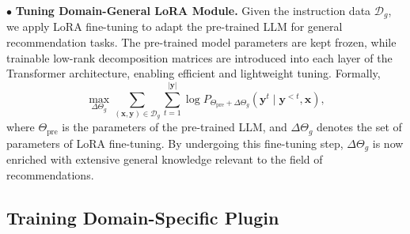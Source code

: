 \iffalse
We denote the mixed user, item, and the interaction set as $\mathcal{U}$, $\mathcal{I}$, $\mathcal{S}$, respectively.
For each user interaction sequence $\mathcal{S}_u=\left[i_u^1, i_u^2, \ldots, i_u^L\right]$ 

For the instruction template, 

 
To provide general user modeling and recommendation knowledge, we mix user behaviors $\mathcal{S}_u=\left[i_u^1, i_u^2, \ldots, i_u^L\right]$ from multiple domains and reconstruct a recommendation instruction dataset $\mathcal{D}_{g}=\{(\textbf{x},\textbf{y})\}$, where $\textbf{x}$ and $\textbf{y}$ denote the instruction input and output, respectively. The choice of the instruction format and the original user behaviors data can be arbitrary. In this work, we collect 8 domains' user recommendation data from Amazon Review dataset\footnote{\url{https://cseweb.ucsd.edu/~jmcauley/datasets.html}}, including Clothing, Cell, Grocery, Health, Home, Pet, Tools, and Videos. Specifically, as shown in the left part of Figure \ref{fig:phase1}, the instruction input starts from a system prompt that defines the LLM's role-"\textit{You are a helpful recommendation assistant}"
\fi

\noindent$\bullet$ \quad\textbf{Tuning Domain-General LoRA Module.}
Given the instruction data $\mathcal{D}_{g}$, we apply LoRA fine-tuning to adapt the pre-trained LLM for general recommendation tasks. The pre-trained model parameters are kept frozen, while trainable low-rank decomposition matrices are introduced into each layer of the Transformer architecture, enabling efficient and lightweight tuning. Formally,
\begin{equation}
\max _{\Delta\Theta_g} \sum_{(\mathbf{x},\mathbf{y}) \in \mathcal{D}_{g}} \sum_{t=1}^{|\mathbf{y}|} \log P_{\Theta_{\text{pre}} +\Delta\Theta_g}\left(\mathbf{y}^t \mid \mathbf{y}^{<t}, \mathbf{x}\right),
\end{equation}
where $\Theta_{\text{pre}}$ is the parameters of the pre-trained LLM, and $\Delta\Theta_g$ denotes the set of parameters of LoRA fine-tuning. By undergoing this fine-tuning step, $\Delta\Theta_g$ is now enriched with extensive general knowledge relevant to the field of recommendations.


\subsection{Training Domain-Specific Plugin}
\label{sec:stage2}

